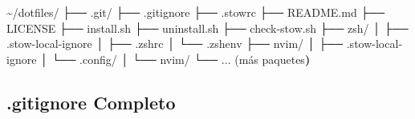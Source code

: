 \documentclass[
  doc,
  floatsintext,
  longtable,
  a4paper,
  nolmodern,
  notxfonts,
  notimes,
  12pt,
  colorlinks=true,linkcolor=blue,citecolor=blue,urlcolor=blue]{apa7}
\newenvironment{Shaded}{\begin{snugshade}}{\end{snugshade}}
\newcommand{\ErrorTok}[1]{\textcolor[rgb]{0.68,0.00,0.00}{#1}}
\newcommand{\ExtensionTok}[1]{\textcolor[rgb]{0.00,0.23,0.31}{#1}}
\newcommand{\KeywordTok}[1]{\textcolor[rgb]{0.00,0.23,0.31}{\textbf{#1}}}
\newcommand{\NormalTok}[1]{\textcolor[rgb]{0.00,0.23,0.31}{#1}}
\begin{document}
\begin{Shaded}
\begin{Highlighting}[]
\ExtensionTok{\textasciitilde{}/dotfiles/}
\ExtensionTok{├──}\NormalTok{ .git/}
\ExtensionTok{├──}\NormalTok{ .gitignore}
\ExtensionTok{├──}\NormalTok{ .stowrc}
\ExtensionTok{├──}\NormalTok{ README.md}
\ExtensionTok{├──}\NormalTok{ LICENSE}
\ExtensionTok{├──}\NormalTok{ install.sh}
\ExtensionTok{├──}\NormalTok{ uninstall.sh}
\ExtensionTok{├──}\NormalTok{ check{-}stow.sh}
\ExtensionTok{├──}\NormalTok{ zsh/}
\ExtensionTok{│}\NormalTok{   ├── .stow{-}local{-}ignore}
\ExtensionTok{│}\NormalTok{   ├── .zshrc}
\ExtensionTok{│}\NormalTok{   └── .zshenv}
\ExtensionTok{├──}\NormalTok{ nvim/}
\ExtensionTok{│}\NormalTok{   ├── .stow{-}local{-}ignore}
\ExtensionTok{│}\NormalTok{   └── .config/}
\ExtensionTok{│}\NormalTok{       └── nvim/}
\ExtensionTok{└──}\NormalTok{ ... }\ErrorTok{(}\ExtensionTok{más}\NormalTok{ paquetes}\KeywordTok{)}
\end{Highlighting}
\end{Shaded}

\subsection{.gitignore Completo}\label{gitignore-completo}
\end{document}
